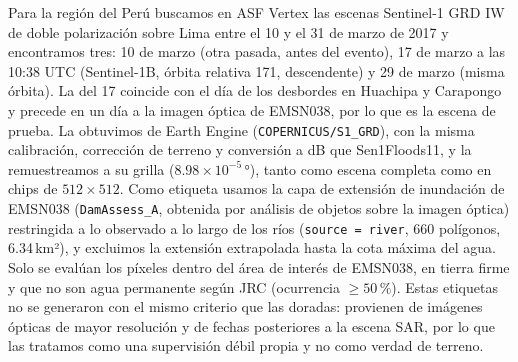 \documentclass[10pt]{article}
\begin{document}
Para la región del Perú buscamos en ASF Vertex las escenas Sentinel-1 GRD IW de doble polarización sobre Lima entre el 10 y el 31 de marzo de 2017 y encontramos tres: 10 de marzo (otra pasada, antes del evento), 17 de marzo a las 10:38 UTC (Sentinel-1B, órbita relativa 171, descendente) y 29 de marzo (misma órbita). La del 17 coincide con el día de los desbordes en Huachipa y Carapongo y precede en un día a la imagen óptica de EMSN038, por lo que es la escena de prueba. La obtuvimos de Earth Engine (\texttt{COPERNICUS/S1\_GRD}), con la misma calibración, corrección de terreno y conversión a dB que Sen1Floods11, y la remuestreamos a su grilla ($8.98\times10^{-5}$\,°), tanto como escena completa como en chips de $512\times512$. Como etiqueta usamos la capa de extensión de inundación de EMSN038 (\texttt{DamAssess\_A}, obtenida por análisis de objetos sobre la imagen óptica) restringida a lo observado a lo largo de los ríos (\texttt{source = river}, 660 polígonos, 6.34\,km²), y excluimos la extensión extrapolada hasta la cota máxima del agua. Solo se evalúan los píxeles dentro del área de interés de EMSN038, en tierra firme y que no son agua permanente según JRC \citep{pekel2016} (ocurrencia $\geq50\,\%$). Estas etiquetas no se generaron con el mismo criterio que las doradas: provienen de imágenes ópticas de mayor resolución y de fechas posteriores a la escena SAR, por lo que las tratamos como una supervisión débil propia y no como verdad de terreno.
\end{document}
